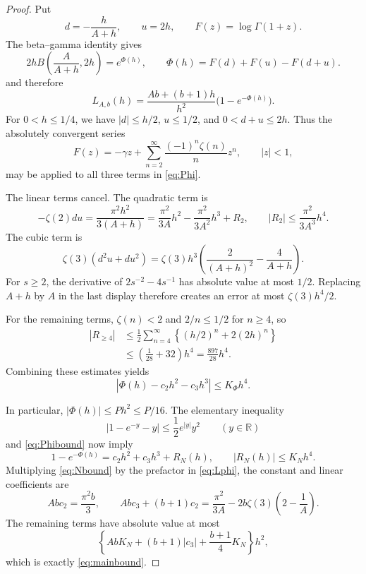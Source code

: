 \documentclass[11pt]{article}
\theoremstyle{remark}
\newcommand{\R}{\mathbb{R}}
\begin{document}
\begin{proof}
Put
\[
 d=-\frac{h}{A+h},\qquad u=2h,\qquad F(z)=\log\Gamma(1+z).
\]
The beta--gamma identity gives
\begin{equation}
 2hB\left(\frac{A}{A+h},2h\right)=e^{\Phi(h)},
 \qquad
 \Phi(h)=F(d)+F(u)-F(d+u).                               \label{eq:Phi}
\end{equation}
and therefore
\begin{equation}
 L_{A,b}(h)=\frac{Ab+(b+1)h}{h^2}\bigl(1-e^{-\Phi(h)}\bigr).
                                                                    \label{eq:Lphi}
\end{equation}
For $0<h\leq1/4$, we have $|d|\leq h/2$, $u\leq1/2$, and
$0<d+u\leq2h$.  Thus the absolutely convergent series
\begin{equation}
 F(z)=-\gamma z+\sum_{n=2}^{\infty}
       \frac{(-1)^n\zeta(n)}{n}z^n,\qquad |z|<1,         \label{eq:loggamma}
\end{equation}
may be applied to all three terms in \eqref{eq:Phi}.

The linear terms cancel.  The quadratic term is
\[
 -\zeta(2)du=\frac{\pi^2h^2}{3(A+h)}
 =\frac{\pi^2}{3A}h^2-\frac{\pi^2}{3A^2}h^3+R_2,
 \qquad |R_2|\leq\frac{\pi^2}{3A^3}h^4.
\]
The cubic term is
\[
 \zeta(3)(d^2u+du^2)
 =\zeta(3)h^3\left(\frac2{(A+h)^2}-\frac4{A+h}\right).
\]
For $s\geq2$, the derivative of $2s^{-2}-4s^{-1}$ has absolute value at
most $1/2$.  Replacing $A+h$ by $A$ in the last display therefore creates
an error at most $\zeta(3)h^4/2$.

For the remaining terms, $\zeta(n)<2$ and $2/n\leq1/2$ for $n\geq4$,
so
\begin{align*}
 |R_{\geq4}|
 &\leq\frac12\sum_{n=4}^{\infty}
   \left\{(h/2)^n+2(2h)^n\right\}\\
 &\leq\left(\frac1{28}+32\right)h^4
   =\frac{897}{28}h^4.
\end{align*}
Combining these estimates yields
\begin{equation}
 |\Phi(h)-c_2h^2-c_3h^3|\leq K_\Phi h^4.                 \label{eq:Phibound}
\end{equation}

In particular, $|\Phi(h)|\leq Ph^2\leq P/16$.  The elementary inequality
\[
 |1-e^{-y}-y|\leq\frac12e^{|y|}y^2\qquad(y\in\R)
\]
and \eqref{eq:Phibound} now imply
\begin{equation}
 1-e^{-\Phi(h)}=c_2h^2+c_3h^3+R_N(h),
 \qquad |R_N(h)|\leq K_Nh^4.                            \label{eq:Nbound}
\end{equation}
Multiplying \eqref{eq:Nbound} by the prefactor in \eqref{eq:Lphi}, the
constant and linear coefficients are
\[
 Abc_2=\frac{\pi^2b}{3},
 \qquad
 Abc_3+(b+1)c_2
 =\frac{\pi^2}{3A}-2b\zeta(3)\left(2-\frac1A\right).
\]
The remaining terms have absolute value at most
\[
 \left\{AbK_N+(b+1)|c_3|+\frac{b+1}{4}K_N\right\}h^2,
\]
which is exactly \eqref{eq:mainbound}.
\end{proof}
\end{document}
